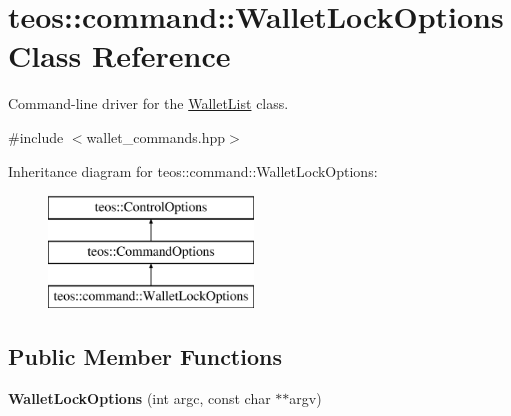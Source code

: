 \hypertarget{classteos_1_1command_1_1_wallet_lock_options}{}\section{teos\+:\+:command\+:\+:Wallet\+Lock\+Options Class Reference}
\label{classteos_1_1command_1_1_wallet_lock_options}


Command-\/line driver for the \mbox{\hyperlink{classteos_1_1command_1_1_wallet_list}{Wallet\+List}} class.  




{\ttfamily \#include $<$wallet\+\_\+commands.\+hpp$>$}

Inheritance diagram for teos\+:\+:command\+:\+:Wallet\+Lock\+Options\+:\begin{figure}[H]
\begin{center}
\leavevmode
\includegraphics[height=3.000000cm]{classteos_1_1command_1_1_wallet_lock_options}
\end{center}
\end{figure}
\subsection*{Public Member Functions}
\begin{DoxyCompactItemize}
\item 
\mbox{\label{classteos_1_1command_1_1_wallet_lock_options_ad486e3cb96e7061b85f5154e0595c725}} 
{\bfseries Wallet\+Lock\+Options} (int argc, const char $\ast$$\ast$argv)
\end{DoxyCompactItemize}
